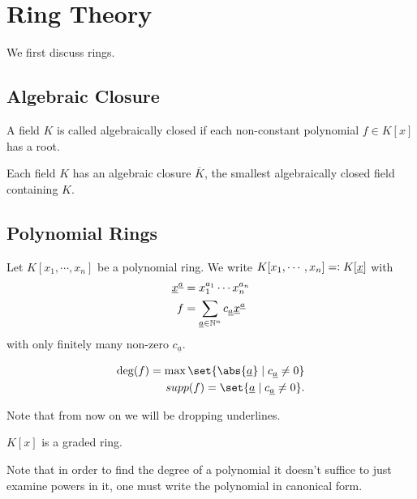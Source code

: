\newpage
\section{Ring Theory}

We first discuss rings.

\subsection{Algebraic Closure}

\begin{definition}
A field $K$ is called algebraically closed if each non-constant polynomial $f \in K[x]$ has a root.
\end{definition}

\begin{theorem}
Each field $K $ has an algebraic closure $\overline{K}$, the smallest algebraically closed field containing $K$.
\end{theorem}

\subsection{Polynomial Rings}

Let $K [ x_1 , \cdots , x_ n ] $ be a polynomial ring. We write $K [ x_1 , \cdots , x_ n ] = \vcentcolon K[ \underline{x} ]$ with
\begin{align*}
    \underline{x}^{\underline{a}} &= x_1^{a_1} \cdots x_n^{a_n}\\
    f &= \sum_{\underline{a} \in \mathbb{N}^n} c_{\underline{a}} \underline{x}^{\underline{a}}
\end{align*}
with only finitely many non-zero $c_{\underline{a}}$.

\begin{definition}
\begin{align*}
    \deg(f) = \max \set{ \abs{\underline{a}} \mid c_{\underline{a}} \neq 0}\\
    supp(f) = \set{ \underline{a} \mid c_{\underline{a}} \neq 0}.
\end{align*}
\end{definition}

Note that from now on we will be dropping underlines.

\begin{remark}
$K[x]$ is a graded ring.
\end{remark}

Note that in order to find the degree of a polynomial it doesn't suffice to just examine powers in it, one must write the polynomial in canonical form.

